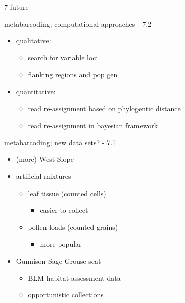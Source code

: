 \documentclass[
  ignorenonframetext,
]{beamer}
\providecommand{\tightlist}{%
  \setlength{\itemsep}{0pt}\setlength{\parskip}{0pt}}
\begin{document}
\begin{frame}{7 \textbar{} future}
\protect\hypertarget{future}{}
\end{frame}

\begin{frame}{metabarcoding; computational approaches - 7.2}
\protect\hypertarget{metabarcoding-computational-approaches---7.2}{}
\begin{itemize}
\tightlist
\item
  qualitative:

  \begin{itemize}
  \tightlist
  \item
    search for variable loci
  \item
    flanking regions and pop gen
  \end{itemize}
\item
  quantitative:

  \begin{itemize}
  \tightlist
  \item
    read re-assignment based on phylogentic distance
  \item
    read re-assignment in bayesian framework
  \end{itemize}
\end{itemize}

\end{frame}

\begin{frame}{metabarcoding; new data sets? - 7.1}
\protect\hypertarget{metabarcoding-new-data-sets---7.1}{}
\begin{itemize}
\tightlist
\item
  (more) West Slope
\item
  artificial mixtures

  \begin{itemize}
  \tightlist
  \item
    leaf tissue (counted cells)

    \begin{itemize}
    \tightlist
    \item
      easier to collect
    \end{itemize}
  \item
    pollen loads (counted grains)

    \begin{itemize}
    \tightlist
    \item
      more popular
    \end{itemize}
  \end{itemize}
\item
  Gunnison Sage-Grouse scat

  \begin{itemize}
  \tightlist
  \item
    BLM habitat assessment data
  \item
    opportunistic collections
  \end{itemize}
\end{itemize}
\end{frame}
\end{document}
